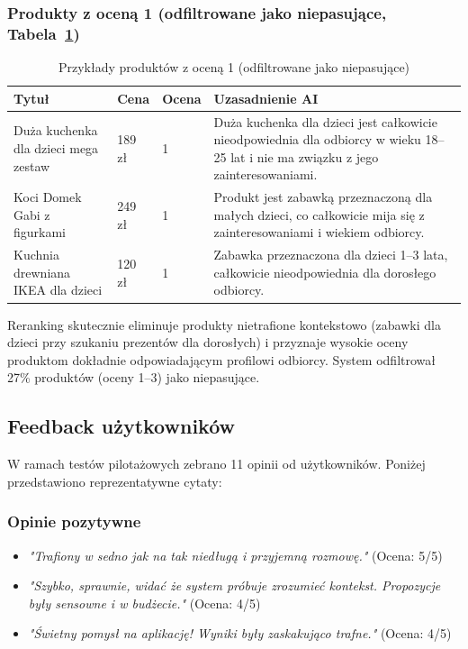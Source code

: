 \documentclass[12pt,a4paper]{article}
\begin{document}
\subsubsection*{Produkty z oceną 1 (odfiltrowane jako niepasujące, Tabela~\ref{tab:reranking-1})}
\begin{table}[H]
\centering
\small
\begin{tabular}{|p{}|p{}|p{}|p{}|}
\hline
\textbf{Tytuł} & \textbf{Cena} & \textbf{Ocena} & \textbf{Uzasadnienie AI} \\
\hline
Duża kuchenka dla dzieci mega zestaw & 189 zł & 1 & Duża kuchenka dla dzieci jest całkowicie nieodpowiednia dla odbiorcy w wieku 18--25 lat i nie ma związku z jego zainteresowaniami. \\
\hline
Koci Domek Gabi z figurkami & 249 zł & 1 & Produkt jest zabawką przeznaczoną dla małych dzieci, co całkowicie mija się z zainteresowaniami i wiekiem odbiorcy. \\
\hline
Kuchnia drewniana IKEA dla dzieci & 120 zł & 1 & Zabawka przeznaczona dla dzieci 1--3 lata, całkowicie nieodpowiednia dla dorosłego odbiorcy. \\
\hline
\end{tabular}
\caption{Przykłady produktów z oceną 1 (odfiltrowane jako niepasujące)}
\label{tab:reranking-1}
\end{table}

Reranking skutecznie eliminuje produkty nietrafione kontekstowo (zabawki dla dzieci przy szukaniu prezentów dla dorosłych) i przyznaje wysokie oceny produktom dokładnie odpowiadającym profilowi odbiorcy. System odfiltrował 27\% produktów (oceny 1--3) jako niepasujące.

\subsection{Feedback użytkowników}

W ramach testów pilotażowych zebrano 11 opinii od użytkowników. Poniżej przedstawiono reprezentatywne cytaty:

\subsubsection*{Opinie pozytywne}
\begin{itemize}
    \item \textit{"Trafiony w sedno jak na tak niedługą i przyjemną rozmowę."} (Ocena: 5/5)
    \item \textit{"Szybko, sprawnie, widać że system próbuje zrozumieć kontekst. Propozycje były sensowne i w budżecie."} (Ocena: 4/5)
    \item \textit{"Świetny pomysł na aplikację! Wyniki były zaskakująco trafne."} (Ocena: 4/5)
\end{itemize}
\end{document}
